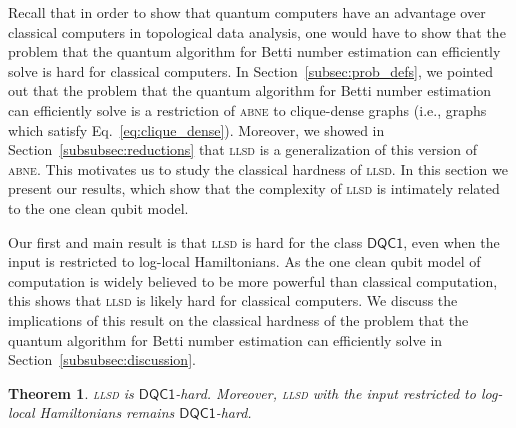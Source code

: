 \documentclass[a4paper, onecolumn, accepted=2022-08-28]{quantumarticle}
\newtheorem{theorem}{Theorem}
\begin{document}
Recall that in order to show that quantum computers have an advantage over classical computers in topological data analysis, one would have to show that the problem that the quantum algorithm for Betti number estimation can efficiently solve is hard for classical computers.
In Section~\ref{subsec:prob_defs}, we pointed out that the problem that the quantum algorithm for Betti number estimation can efficiently solve is a restriction of \textsc{abne} to clique-dense graphs (i.e., graphs which satisfy Eq.~\eqref{eq:clique_dense}).
Moreover, we showed in Section~\ref{subsubsec:reductions} that \textsc{llsd} is a generalization of this version of \textsc{abne}.
This motivates us to study the classical hardness of \textsc{llsd}.
In this section we present our results, which show that the complexity of \textsc{llsd} is intimately related to the one clean qubit model.

Our first and main result is that \textsc{llsd} is hard for the class $\mathsf{DQC1}$, even when the input is restricted to log-local Hamiltonians.
As the one clean qubit model of computation is widely believed to be more powerful than classical computation, this shows that \textsc{llsd} is likely hard for classical computers.
We discuss the implications of this result on the classical hardness of the problem that the quantum algorithm for Betti number estimation can efficiently solve in Section~\ref{subsubsec:discussion}.

\begin{theorem}
  \textsc{llsd} is $\mathsf{DQC1}$-hard.
  Moreover, \textsc{llsd} with the input restricted to log-local Hamiltonians remains $\mathsf{DQC1}$-hard.
 \label{thm:dqc1_hardness_llsd}
\end{theorem}
\end{document}
